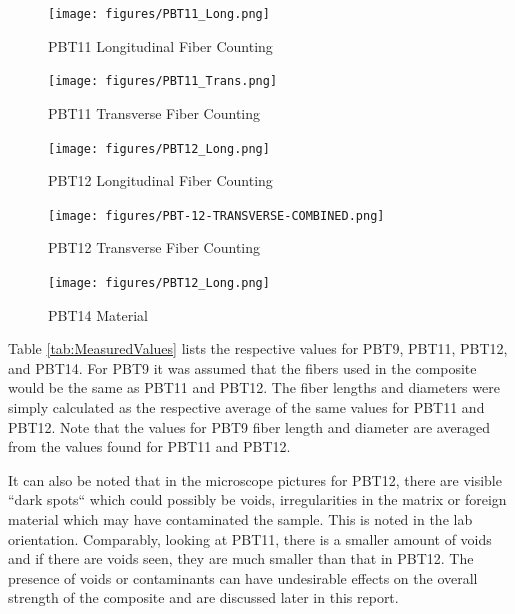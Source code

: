 \documentclass[11pt]{article}
\begin{document}
\begin{figure}[H]
\centering
\texttt{[image: figures/PBT11\_Long.png]}
\caption{PBT11 Longitudinal Fiber Counting}
\label{pbt11longcount}
\end{figure}
\begin{figure}[H]
\centering
\texttt{[image: figures/PBT11\_Trans.png]}
\caption{PBT11 Transverse Fiber Counting}
\label{pbt11transcount}
\end{figure}
\begin{figure}[H]
\centering
\texttt{[image: figures/PBT12\_Long.png]}
\caption{PBT12 Longitudinal Fiber Counting}
\label{pbt12longcount}
\end{figure}
\begin{figure}[H]
\centering
\texttt{[image: figures/PBT-12-TRANSVERSE-COMBINED.png]}
\caption{PBT12 Transverse Fiber Counting}
\label{pbt12transcount}
\end{figure}

\begin{figure}[H]
\centering
\texttt{[image: figures/PBT12\_Long.png]}
\caption{PBT14 Material}
\label{pbt12longcount}
\end{figure}

Table \ref{tab:MeasuredValues} lists the respective values for PBT9, PBT11, PBT12, and PBT14. For PBT9 it was assumed that the fibers used in the composite would be the same as PBT11 and PBT12. The fiber lengths and diameters were simply calculated as the respective average of the same values for PBT11 and PBT12.  Note that the values for PBT9 fiber length and diameter are averaged from the values found for PBT11 and PBT12.

It can also be noted that in the microscope pictures for PBT12, there are visible ``dark spots`` which could possibly be voids, irregularities in the matrix or foreign material which may have contaminated the sample. This is noted in the lab orientation. Comparably, looking at PBT11, there is a smaller amount of voids and if there are voids seen, they are much smaller than that in PBT12. The presence of voids or contaminants can have undesirable effects on the overall strength of the composite and are discussed later in this report. 
\end{document}
